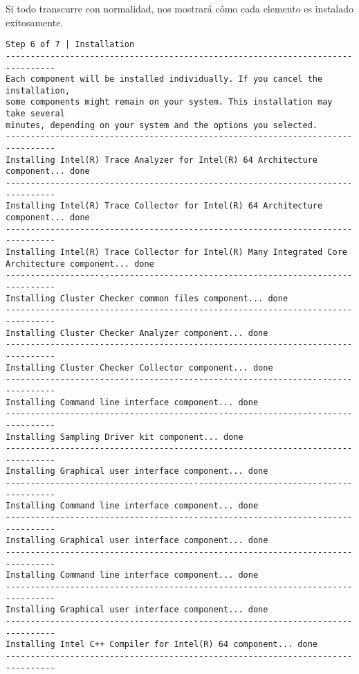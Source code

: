 Si todo transcurre con normalidad, nos mostrará cómo cada elemento es instalado exitosamente.

\begin{lstlisting}
Step 6 of 7 | Installation
--------------------------------------------------------------------------------
Each component will be installed individually. If you cancel the installation,
some components might remain on your system. This installation may take several 
minutes, depending on your system and the options you selected.
--------------------------------------------------------------------------------
Installing Intel(R) Trace Analyzer for Intel(R) 64 Architecture component... done
--------------------------------------------------------------------------------
Installing Intel(R) Trace Collector for Intel(R) 64 Architecture component... done
--------------------------------------------------------------------------------
Installing Intel(R) Trace Collector for Intel(R) Many Integrated Core
Architecture component... done
--------------------------------------------------------------------------------
Installing Cluster Checker common files component... done
--------------------------------------------------------------------------------
Installing Cluster Checker Analyzer component... done
--------------------------------------------------------------------------------
Installing Cluster Checker Collector component... done
--------------------------------------------------------------------------------
Installing Command line interface component... done
--------------------------------------------------------------------------------
Installing Sampling Driver kit component... done
--------------------------------------------------------------------------------
Installing Graphical user interface component... done
--------------------------------------------------------------------------------
Installing Command line interface component... done
--------------------------------------------------------------------------------
Installing Graphical user interface component... done
--------------------------------------------------------------------------------
Installing Command line interface component... done
--------------------------------------------------------------------------------
Installing Graphical user interface component... done
--------------------------------------------------------------------------------
Installing Intel C++ Compiler for Intel(R) 64 component... done
--------------------------------------------------------------------------------

\end{lstlisting}
